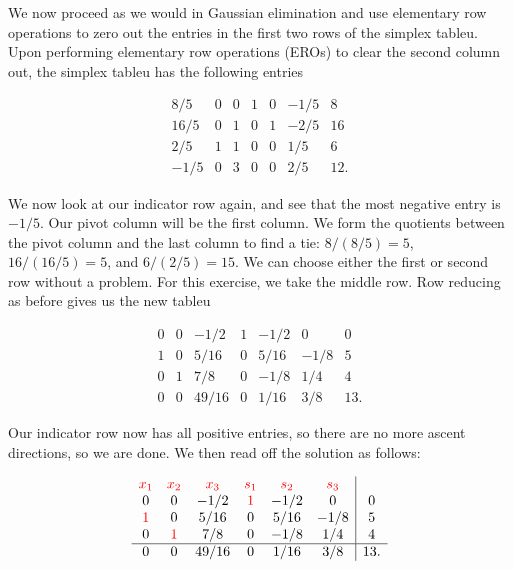 \documentclass[12pt,english]{article}
\begin{document}
We now proceed as we would in Gaussian elimination and use elementary row operations to zero out the entries in the first two rows of the simplex tableu.   Upon performing elementary row operations (EROs) to clear the second column out, the simplex tableu has the following entries

\begin{equation}
\begin{array}{cccccc|c}
8/5 	&	0	&	0	&	1	&	0	&	-1/5 	&	8 \\
16/5	&	0	&	1	&	0	&	1	&	-2/5	&	16 \\
2/5	&	1	&	1	&	0	&	0	&	1/5	&	6 \\
\hline
-1/5	&	0	&	3	&	0	&	0	&	2/5	&	12.
\end{array}
\end{equation}

We now look at our indicator row again, and see that the most negative entry is $-1/5$.  Our pivot column will be the first column.  We form the quotients between the pivot column and the last column to find a tie: $8/(8/5) = 5$, $16/(16/5) = 5$, and $6/(2/5)=15$.  We can choose either the first or second row without a problem.  For this exercise, we take the middle row.   Row reducing as before gives us the new tableu

\begin{equation}
\begin{array}{cccccc|c}
0 	&	0	&	-1/2	&	1	&	-1/2	&	0 	&	0 \\
1	&	0	&	5/16	&	0	&	5/16	&	-1/8	&	5 \\
0	&	1	&	7/8	&	0	&	-1/8	&	1/4	&	4 \\
\hline
0	&	0	&   49/16  &	0	&	1/16	&	3/8	&	13.
\end{array}
\end{equation}

Our indicator row now has all positive entries, so there are no more ascent directions, so we are done.  We then read off the solution as follows:

\begin{equation}
\begin{array}{cccccc|c}
\textcolor{red}{x_1}   &     \textcolor{red}{x_2} 	& \textcolor{red}{x_3} & \textcolor{red}{s_1}  & \textcolor{red}{s_2} & \textcolor{red}{s_3}   & 	\\
0 				&	0				&	-1/2	&	\textcolor{red}{1}	&	-1/2	&	0 	&	0 \\
\textcolor{red}{1}	&	0				&	5/16	&	0				&	5/16	&	-1/8	&	5 \\
0				&	\textcolor{red}{1}	&	7/8	&	0				&	-1/8	&	1/4	&	4 \\
\hline
0				&	0				&   49/16  &	0				&	1/16	&	3/8	&	13.
\end{array}
\end{equation}
\end{document}
